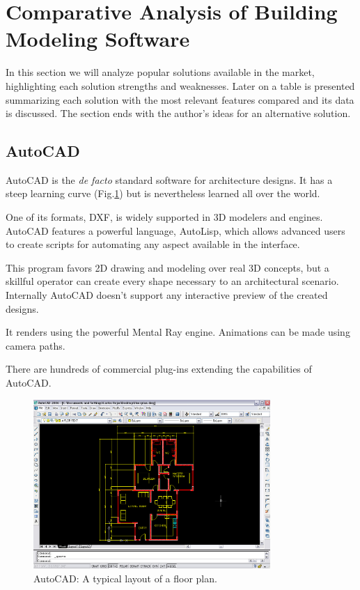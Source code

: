 \section{Comparative Analysis of Building Modeling Software}

In this section we will analyze popular solutions available in the market,
highlighting each solution strengths and weaknesses.
Later on a table is presented summarizing each solution
with the most relevant features compared and its data is discussed.
The section ends with the author's ideas for an alternative solution.

\subsection{AutoCAD}
AutoCAD\cite{SITE-AUTOCAD} is the \emph{de facto} standard software for architecture designs.
It has a steep learning curve (Fig.\ref{FIG-AUTOCAD}) but is nevertheless
learned all over the world.

One of its formats, DXF, is widely supported in 3D modelers and engines.
AutoCAD features a powerful language, AutoLisp, which allows advanced users to create scripts for
automating any aspect available in the interface.

This program favors 2D drawing and modeling over real 3D concepts,
but a skillful operator can create every shape necessary to an architectural scenario.
Internally AutoCAD doesn't support any interactive preview of the created designs.

It renders using the powerful Mental Ray\nocite{SITE-MENTAL} engine.
Animations can be made using camera paths.

There are hundreds of commercial plug-ins extending the capabilities of AutoCAD.

\begin{figure}[!ht]
    \centering
    \includegraphics[width=9cm]{gfx/autocad-1.png}
    \caption{AutoCAD: A typical layout of a floor plan.}
    \label{FIG-AUTOCAD}
\end{figure}

